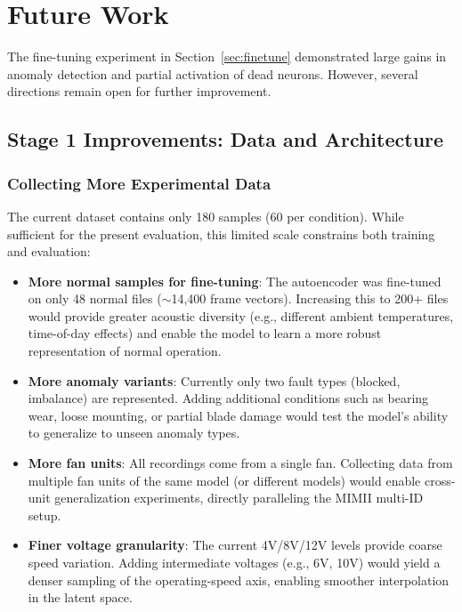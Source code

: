 \documentclass[12pt, a4paper]{article}
\begin{document}
\section{Future Work}
\label{sec:future}

The fine-tuning experiment in Section~\ref{sec:finetune} demonstrated large gains in anomaly detection and partial activation of dead neurons. However, several directions remain open for further improvement.

\subsection{Stage 1 Improvements: Data and Architecture}

\subsubsection{Collecting More Experimental Data}

The current dataset contains only 180 samples (60 per condition). While sufficient for the present evaluation, this limited scale constrains both training and evaluation:

\begin{itemize}
    \item \textbf{More normal samples for fine-tuning}: The autoencoder was fine-tuned on only 48 normal files ($\sim$14,400 frame vectors). Increasing this to 200+ files would provide greater acoustic diversity (e.g., different ambient temperatures, time-of-day effects) and enable the model to learn a more robust representation of normal operation.
    \item \textbf{More anomaly variants}: Currently only two fault types (blocked, imbalance) are represented. Adding additional conditions such as bearing wear, loose mounting, or partial blade damage would test the model's ability to generalize to unseen anomaly types.
    \item \textbf{More fan units}: All recordings come from a single fan. Collecting data from multiple fan units of the same model (or different models) would enable cross-unit generalization experiments, directly paralleling the MIMII multi-ID setup.
    \item \textbf{Finer voltage granularity}: The current 4V/8V/12V levels provide coarse speed variation. Adding intermediate voltages (e.g., 6V, 10V) would yield a denser sampling of the operating-speed axis, enabling smoother interpolation in the latent space.
\end{itemize}
\end{document}
